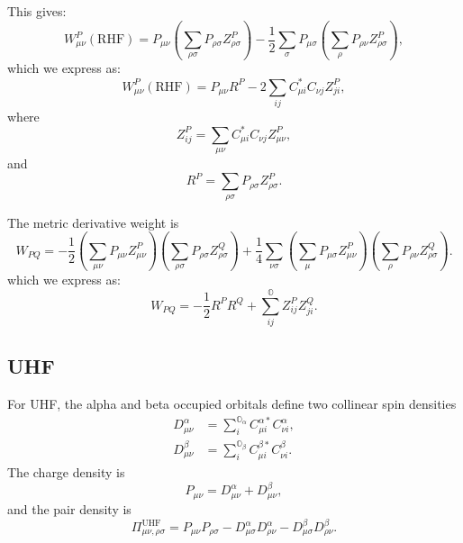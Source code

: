 \documentclass[aip,preprint]{revtex4-1}
\begin{document}
This gives:
\begin{equation}
W^P_{\mu\nu}(\mathrm{RHF})
=
P_{\mu\nu} (\sum_{\rho\sigma}P_{\rho\sigma}
Z^P_{\rho\sigma})
-\frac{1}{2}\sum_{\sigma}P_{\mu\sigma}(\sum_{\rho} P_{\rho\nu}Z^P_{\rho\sigma}),
\end{equation}
which we express as:
\begin{equation}
W^P_{\mu\nu}(\mathrm{RHF})
=
P_{\mu\nu} R^P
-2\sum_{ij} C_{\mu i}^* C_{\nu j} Z^P_{ji},
\end{equation}
where
\begin{equation}
Z^P_{ij} = \sum_{\mu\nu} C_{\mu i}^* C_{\nu j} Z^P_{\mu\nu},
\end{equation}
and
\begin{equation}
R^P = \sum_{\rho\sigma}P_{\rho\sigma}
Z^P_{\rho\sigma}.
\end{equation}

The metric derivative weight is
\begin{equation}
W_{PQ}
=
-\frac{1}{2}
(\sum_{\mu \nu} P_{\mu\nu}Z^P_{\mu\nu})(\sum_{\rho\sigma} P_{\rho\sigma}
Z^Q_{\rho\sigma})
+
\frac{1}{4}
\sum_{\nu\sigma}(\sum_\mu P_{\mu\sigma}Z^P_{\mu\nu}) (\sum_\rho P_{\rho\nu}
Z^Q_{\rho\sigma}).
\label{eq:rhf_w2_aux}
\end{equation}
which we express as:
\begin{equation}
W_{PQ}
=
-\frac{1}{2}
R^P R^Q
+
\sum_{ij}^\mathbb{O} Z^P_{ij} Z^Q_{ji}.
\label{eq:rhf_w2_aux}
\end{equation}

\subsection{UHF}

For UHF, the alpha and beta occupied orbitals define two collinear spin
densities
\begin{align}
D^\alpha_{\mu\nu}
&=
\sum_i^{\mathbb{O}_\alpha}
C^{\alpha *}_{\mu i}C^\alpha_{\nu i},
\\
D^\beta_{\mu\nu}
&=
\sum_i^{\mathbb{O}_\beta}
C^{\beta *}_{\mu i}C^\beta_{\nu i}.
\end{align}
The charge density is
\begin{equation}
P_{\mu\nu}=D^\alpha_{\mu\nu}+D^\beta_{\mu\nu},
\end{equation}
and the pair density is
\begin{equation}
\Pi_{\mu\nu,\rho\sigma}^{\mathrm{UHF}}
=
P_{\mu\nu}P_{\rho\sigma}
-
D^\alpha_{\mu\sigma}D^\alpha_{\rho\nu}
-
D^\beta_{\mu\sigma}D^\beta_{\rho\nu}.
\label{eq:uhf_pair_density}
\end{equation}
\end{document}
